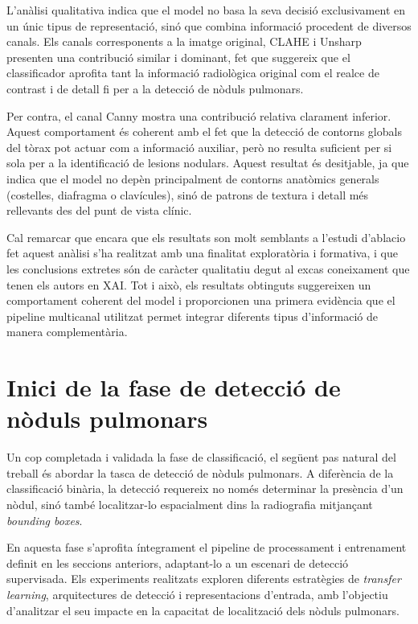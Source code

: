 \documentclass[conference]{IEEEtran}
\begin{document}
L’anàlisi qualitativa indica que el model no basa la seva decisió exclusivament
en un únic tipus de representació, sinó que combina informació procedent de
diversos canals. Els canals corresponents a la imatge original, CLAHE i Unsharp
presenten una contribució similar i dominant, fet que suggereix que el
classificador aprofita tant la informació radiològica original com el realce de
contrast i de detall fi per a la detecció de nòduls pulmonars. 

Per contra, el canal Canny mostra una contribució relativa clarament inferior.
Aquest comportament és coherent amb el fet que la detecció de contorns globals
del tòrax pot actuar com a informació auxiliar, però no resulta suficient per
si sola per a la identificació de lesions nodulars. Aquest resultat és
desitjable, ja que indica que el model no depèn principalment de contorns
anatòmics generals (costelles, diafragma o clavícules), sinó de patrons de
textura i detall més rellevants des del punt de vista clínic.

Cal remarcar que encara que els resultats son molt semblants a l'estudi d'ablacio fet  aquest anàlisi s’ha realitzat amb una finalitat
exploratòria i formativa, i que les conclusions extretes són de caràcter
qualitatiu degut al excas coneixament que tenen els autors en XAI. Tot i això, els resultats obtinguts suggereixen un comportament
coherent del model i proporcionen una primera evidència que el pipeline
multicanal utilitzat permet integrar diferents tipus d’informació de manera
complementària.
\newpage
\newpage



\section{Inici de la fase de detecció de nòduls pulmonars}

Un cop completada i validada la fase de classificació, el següent pas natural del
treball és abordar la tasca de detecció de nòduls pulmonars. A diferència de la
classificació binària, la detecció requereix no només determinar la presència d’un
nòdul, sinó també localitzar-lo espacialment dins la radiografia mitjançant
\textit{bounding boxes}.

En aquesta fase s’aprofita íntegrament el pipeline de processament i entrenament
definit en les seccions anteriors, adaptant-lo a un escenari de detecció supervisada.
Els experiments realitzats exploren diferents estratègies de \textit{transfer learning},
arquitectures de detecció i representacions d’entrada, amb l’objectiu d’analitzar el
seu impacte en la capacitat de localització dels nòduls pulmonars.
\end{document}
